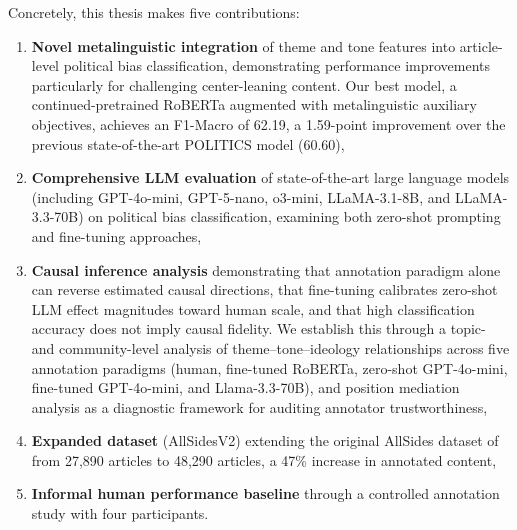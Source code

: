Concretely, this thesis makes five contributions:

\begin{enumerate}
    \item \textbf{Novel metalinguistic integration} of theme and tone features into article-level political bias classification, demonstrating performance improvements particularly for challenging center-leaning content. Our best model, a continued-pretrained RoBERTa augmented with metalinguistic auxiliary objectives, achieves an F1-Macro of 62.19, a 1.59-point improvement over the previous state-of-the-art POLITICS model \citep{liu2022politics} (60.60),
    \item \textbf{Comprehensive LLM evaluation} of state-of-the-art large language models (including GPT-4o-mini, GPT-5-nano, o3-mini, LLaMA-3.1-8B, and LLaMA-3.3-70B) on political bias classification, examining both zero-shot prompting and fine-tuning approaches,
    \item \textbf{Causal inference analysis} demonstrating that annotation paradigm alone can reverse estimated causal directions, that fine-tuning calibrates zero-shot LLM effect magnitudes toward human scale, and that high classification accuracy does not imply causal fidelity. We establish this through a topic- and community-level analysis of theme--tone--ideology relationships across five annotation paradigms (human, fine-tuned RoBERTa, zero-shot GPT-4o-mini, fine-tuned GPT-4o-mini, and Llama-3.3-70B), and position mediation analysis as a diagnostic framework for auditing annotator trustworthiness,
    \item \textbf{Expanded dataset} (AllSidesV2) extending the original AllSides dataset of \citet{baly2020we} from 27,890 articles to 48,290 articles, a 47\% increase in annotated content,
    \item \textbf{Informal human performance baseline} through a controlled annotation study with four participants.
\end{enumerate}
